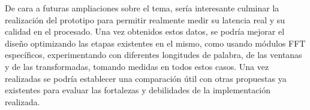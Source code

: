 De cara a futuras ampliaciones sobre el tema, sería interesante culminar la realización del prototipo para permitir realmente medir su latencia real y su calidad en el procesado. Una vez obtenidos estos datos, se podría mejorar el diseño optimizando las etapas existentes en el mismo, como usando módulos FFT específicos, experimentando con diferentes longitudes de palabra, de las ventanas y de las transformadas, tomando medidas en todos estos casos. Una vez realizadas se podría establecer una comparación útil con otras propuestas ya existentes para evaluar las fortalezas y debilidades de la implementación realizada. 

